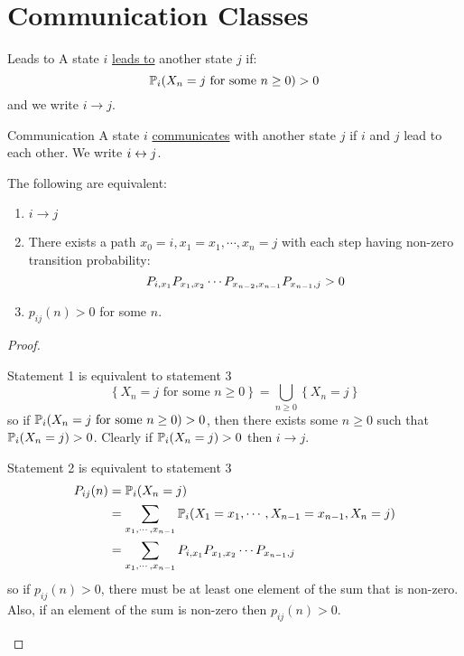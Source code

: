 \documentclass[../Main.tex]{subfiles}
\begin{document}
\section{Communication Classes}
\begin{definition}{Leads to}
    A state $i$ \underline{leads to} another state $j$ if:
    \begin{equation*}
        \P_i(X_n = j \text{ for some } n\geq 0) > 0
    \end{equation*}
    and we write $i \to j$.
\end{definition}
\begin{definition}{Communication}
    A state $i$ \underline{communicates} with another state $j$ if $i$ and $j$ lead to each other. We write $i \comms j$.
\end{definition}
\begin{theorem}
    The following are equivalent:
    \begin{enumerate}
        \item $i \to j$
        \item There exists a path $x_0 = i, x_1 = x_1, \cdots, x_n = j$ with each step having non-zero transition probability:
            \begin{equation*}
                P_{i, x_1} \Pmat{1}{2} \cdots \Pmat{n-2}{n-1} P_{x_{n-1}, j} > 0
            \end{equation*}
        \item $p_{ij}(n) > 0$ for some $n$.
    \end{enumerate}
    \label{thmCommEquivalence}
\end{theorem}
\begin{proof}
    \begin{subproof}{Statement 1 is equivalent to statement 3}
        \begin{equation*}
            \left\{X_n = j \text{ for some } n \geq 0\right\} = \bigcup_{n \geq 0} \left\{X_n = j\right\}
        \end{equation*}
        so if $\P_i(X_n = j \text{ for some } n \geq 0) > 0$, then there exists some $n \geq 0$ such that $\P_i(X_n = j) > 0$. Clearly if $\P_i(X_n = j) > 0$ then $i \to j$.
    \end{subproof}
    \begin{subproof}{Statement 2 is equivalent to statement 3}
        \begin{align*}
            P_{ij}(n) &= \P_i(X_n = j) \\
            &= \sum_{x_1, \cdots, x_{n-1}} \P_i(X_1 = x_1, \cdots, X_{n-1} = x_{n-1}, X_n = j) \\
            &= \sum_{x_1, \cdots, x_{n-1}} P_{i, x_1} \Pmat{1}{2} \cdots P_{x_{n-1}, j}
        \end{align*}
        so if $p_{ij}(n) > 0$, there must be at least one element of the sum that is non-zero. Also, if an element of the sum is non-zero then $p_{ij}(n) > 0$.
    \end{subproof}
\end{proof}
\end{document}

